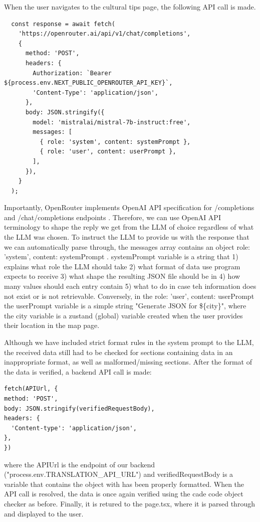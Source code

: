 When the user navigates to the cultural tips page, the following API call is made. 
\begin{verbatim} 
  const response = await fetch(
    'https://openrouter.ai/api/v1/chat/completions',
    {
      method: 'POST',
      headers: {
        Authorization: `Bearer ${process.env.NEXT_PUBLIC_OPENROUTER_API_KEY}`,
        'Content-Type': 'application/json',
      },
      body: JSON.stringify({
        model: 'mistralai/mistral-7b-instruct:free',
        messages: [
          { role: 'system', content: systemPrompt },
          { role: 'user', content: userPrompt },
        ],
      }),
    }
  );
\end{verbatim}
Importantly, OpenRouter implements OpenAI API specification for /completions and /chat/completions endpoints \cite{noauthor_openrouter_nodate}. Therefore, we can use OpenAI API terminology \cite{openAI_explanation_onHowToUseTheirApi} to shape the reply we get from the LLM of choice regardless of what the LLM was chosen. To instruct the LLM to provide us with the response that we can automatically parse through, the messages array contains an object { role: 'system', content: systemPrompt }. systemPrompt variable is a string that 1) explains what role the LLM should take 2) what format of data use program expects to receive 3) what shape the resulting JSON file should be in 4) how many values should each entry contain 5) what to do in case teh information does not exist or is not retrievable. Conversely, in the { role: 'user', content: userPrompt } the userPrompt variable is a simple string "Generate JSON for \$\{city\}", where the city variable is a zustand (global) variable created when the user provides their location in the map page. 

Although we have included strict format rules in the system prompt to the LLM, the received data still had to be checked for sections containing data in an inappropriate format, as well as malformed/missing sections. After the format of the data is verified, a backend API call is made:
\begin{verbatim} 
fetch(APIUrl, {
method: 'POST',
body: JSON.stringify(verifiedRequestBody),
headers: {
  'Content-type': 'application/json',
},
})
\end{verbatim}
where the APIUrl is the endpoint of our backend ("process.env.TRANSLATION\_API\_URL") and verifiedRequestBody is a variable that contains the object with has been properly formatted. When the API call is resolved, the data is once again verified using the cade code object checker as before. Finally, it is retured to the page.tsx, where it is parsed through and displayed to the user. 

